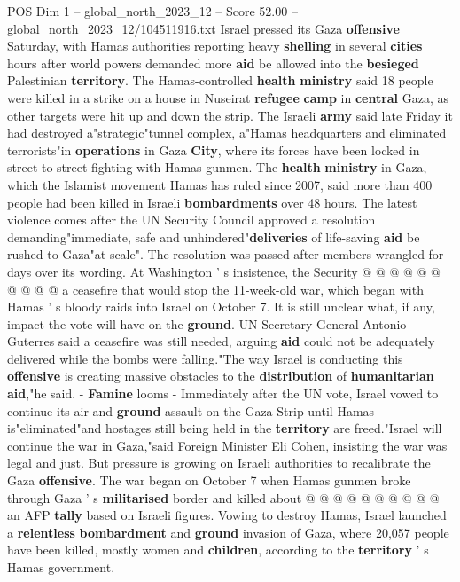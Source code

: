 \begin{textsample}{POS Dim 1 – global\_north\_2023\_12 – Score 52.00 – global\_north\_2023\_12/104511916.txt}  \label{ex:f1_pos_081}
Israel pressed its Gaza \textbf{offensive} Saturday, with Hamas authorities reporting heavy \textbf{shelling} in several \textbf{cities} hours after world powers demanded more \textbf{aid} be allowed into the \textbf{besieged} Palestinian \textbf{territory}.
The Hamas-controlled \textbf{health} \textbf{ministry} said 18 people were killed in a strike on a house in Nuseirat \textbf{refugee} \textbf{camp} in \textbf{central} Gaza, as other targets were hit up and down the strip.
The Israeli \textbf{army} said late Friday it had destroyed a"strategic"tunnel complex, a"Hamas headquarters and eliminated terrorists"in \textbf{operations} in Gaza \textbf{City}, where its forces have been locked in street-to-street fighting with Hamas gunmen.
The \textbf{health} \textbf{ministry} in Gaza, which the Islamist movement Hamas has ruled since 2007, said more than 400 people had been killed in Israeli \textbf{bombardments} over 48 hours.
The latest violence comes after the UN Security Council approved a resolution demanding"immediate, safe and unhindered"\textbf{deliveries} of life-saving \textbf{aid} be rushed to Gaza"at scale".
The resolution was passed after members wrangled for days over its wording.
At Washington ' s insistence, the Security @ @ @ @ @ @ @ @ @ @ a ceasefire that would stop the 11-week-old war, which began with Hamas ' s bloody raids into Israel on October 7.
It is still unclear what, if any, impact the vote will have on the \textbf{ground}.
UN Secretary-General Antonio Guterres said a ceasefire was still needed, arguing \textbf{aid} could not be adequately delivered while the bombs were falling."The way Israel is conducting this \textbf{offensive} is creating massive obstacles to the \textbf{distribution} of \textbf{humanitarian} \textbf{aid},"he said. - \textbf{Famine} looms - Immediately after the UN vote, Israel vowed to continue its air and \textbf{ground} assault on the Gaza Strip until Hamas is"eliminated"and hostages still being held in the \textbf{territory} are freed."Israel will continue the war in Gaza,"said Foreign Minister Eli Cohen, insisting the war was legal and just.
But pressure is growing on Israeli authorities to recalibrate the Gaza \textbf{offensive}.
The war began on October 7 when Hamas gunmen broke through Gaza ' s \textbf{militarised} border and killed about @ @ @ @ @ @ @ @ @ @ an AFP \textbf{tally} based on Israeli figures.
Vowing to destroy Hamas, Israel launched a \textbf{relentless} \textbf{bombardment} and \textbf{ground} invasion of Gaza, where 20,057 people have been killed, mostly women and \textbf{children}, according to the \textbf{territory} ' s Hamas government.

\end{textsample}
